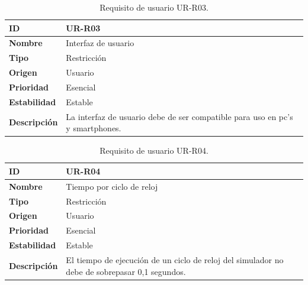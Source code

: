 \begin{center}
\begin{table}[htbp]
\centering
\begin{tabular}{@{}p{2.5cm} p{9cm}@{}} 
\toprule
\textbf{ID} 				& UR-R03 \\
\midrule
\textbf{Nombre} 			& Interfaz de usuario \\
\midrule
\textbf{Tipo} 			& Restricción \\
\midrule
\textbf{Origen} 			& Usuario \\
\midrule
\textbf{Prioridad}		& Esencial \\
\midrule
\textbf{Estabilidad} 		& Estable \\
\midrule
\textbf{Descripción} 	& La interfaz de usuario debe de ser compatible para uso en pc's y smartphones. \\
\bottomrule
\end{tabular}
\caption{Requisito de usuario UR-R03.}
\label{tab:urr03}
\end{table}
\end{center}

\begin{center}
\begin{table}[htbp]
\centering
\begin{tabular}{@{}p{2.5cm} p{9cm}@{}} 
\toprule
\textbf{ID} 				& UR-R04 \\
\midrule
\textbf{Nombre} 			& Tiempo por ciclo de reloj \\
\midrule
\textbf{Tipo} 			& Restricción \\
\midrule
\textbf{Origen} 			& Usuario \\
\midrule
\textbf{Prioridad}		& Esencial \\
\midrule
\textbf{Estabilidad} 		& Estable \\
\midrule
\textbf{Descripción} 	& El tiempo de ejecución de un ciclo de reloj del simulador no debe de sobrepasar 0,1 segundos. \\
\bottomrule
\end{tabular}
\caption{Requisito de usuario UR-R04.}
\label{tab:urr04}
\end{table}
\end{center}

